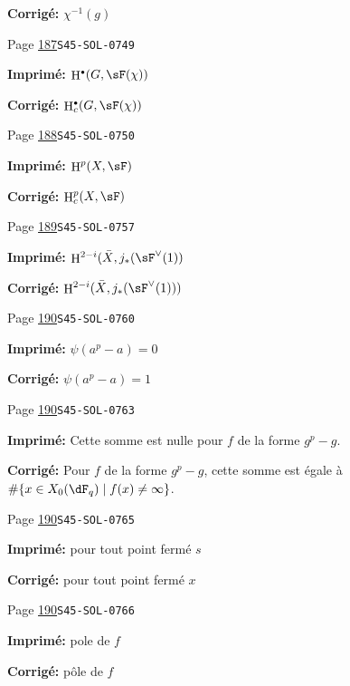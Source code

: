 \documentclass[oneside]{book}
\DeclareMathOperator{\h}{H}
\theoremstyle{sga-source}
\theoremstyle{sga-source-dash}
\theoremstyle{sga-source-dotdash}
\theoremstyle{sga-source-number-note-dash}
\theoremstyle{sga-source-note-number-dotdash}
\theoremstyle{sga-source-example-dotdash}
\theoremstyle{sga-source-inline-number}
\theoremstyle{sga-source-bare-number}
\theoremstyle{sga-source}
\let\oldbullet\bullet
\renewcommand{\bullet}{\textnormal{\tiny$\oldbullet$}}
\begin{document}
\begin{description}
\par\noindent\textbf{Corrigé:} \(\chi^{-1}(g)\)
\smallskip
\item[\hypertarget{apparatus:FR-0156}{156}] Page \hyperlink{printpage:fr:187}{187}\quad\texttt{S45-SOL-0749}
\par\noindent\textbf{Imprimé:} \(\h^\bullet(G,\sF(\chi))\)
\par\noindent\textbf{Corrigé:} \(\h_c^\bullet(G,\sF(\chi))\)
\smallskip
\item[\hypertarget{apparatus:FR-0157}{157}] Page \hyperlink{printpage:fr:188}{188}\quad\texttt{S45-SOL-0750}
\par\noindent\textbf{Imprimé:} \(\h^p(X,\sF)\)
\par\noindent\textbf{Corrigé:} \(\h_c^p(X,\sF)\)
\smallskip
\item[\hypertarget{apparatus:FR-0158}{158}] Page \hyperlink{printpage:fr:189}{189}\quad\texttt{S45-SOL-0757}
\par\noindent\textbf{Imprimé:} \(\h^{2-i}(\bar X,j_\ast(\sF^\vee(1))\)
\par\noindent\textbf{Corrigé:} \(\h^{2-i}(\bar X,j_\ast(\sF^\vee(1)))\)
\smallskip
\item[\hypertarget{apparatus:FR-0159}{159}] Page \hyperlink{printpage:fr:190}{190}\quad\texttt{S45-SOL-0760}
\par\noindent\textbf{Imprimé:} \(\psi(a^p-a)=0\)
\par\noindent\textbf{Corrigé:} \(\psi(a^p-a)=1\)
\smallskip
\item[\hypertarget{apparatus:FR-0160}{160}] Page \hyperlink{printpage:fr:190}{190}\quad\texttt{S45-SOL-0763}
\par\noindent\textbf{Imprimé:} Cette somme est nulle pour $f$ de la forme $g^p-g$.
\par\noindent\textbf{Corrigé:} Pour $f$ de la forme $g^p-g$, cette somme est égale à $\#\{x\in X_0(\dF_q)\mid f(x)\ne\infty\}$.
\smallskip
\item[\hypertarget{apparatus:FR-0161}{161}] Page \hyperlink{printpage:fr:190}{190}\quad\texttt{S45-SOL-0765}
\par\noindent\textbf{Imprimé:} pour tout point fermé $s$
\par\noindent\textbf{Corrigé:} pour tout point fermé $x$
\smallskip
\item[\hypertarget{apparatus:FR-0162}{162}] Page \hyperlink{printpage:fr:190}{190}\quad\texttt{S45-SOL-0766}
\par\noindent\textbf{Imprimé:} pole de $f$
\par\noindent\textbf{Corrigé:} pôle de $f$

\end{description}
\end{document}

